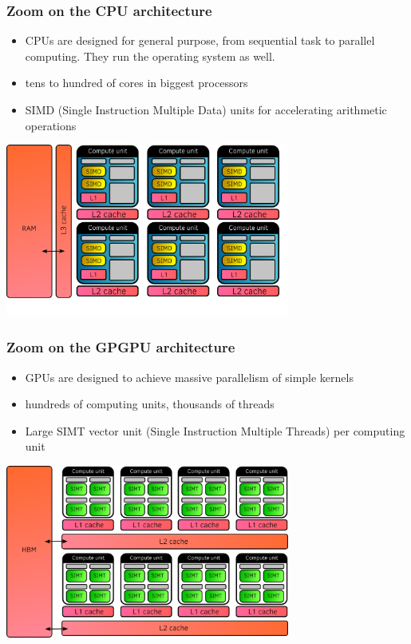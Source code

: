\documentclass[aspectratio=169]{beamer}
\begin{document}
\begin{frame}
    \frametitle{Zoom on the CPU architecture}

    \small
    \begin{itemize}
        \item CPUs are designed for general purpose, from sequential task to parallel computing. They run the operating system as well.
        \item tens to hundred of cores in biggest processors
        \item SIMD (Single Instruction Multiple Data) units for accelerating arithmetic operations
    \end{itemize}
    
    \begin{center}
        \includegraphics[width=0.7\textwidth]{../../images/cpu_architecture.png}
    \end{center}
    
\end{frame}



\begin{frame}
    \frametitle{Zoom on the GPGPU architecture}

\small
\begin{itemize}
    \item GPUs are designed to achieve massive parallelism of simple kernels
    \item hundreds of computing units, thousands of threads
    \item Large SIMT vector unit (Single Instruction Multiple Threads) per computing unit
\end{itemize}

\begin{center}
    \includegraphics[width=0.7\textwidth]{../../images/gpu_architecture.png}
\end{center}

\end{frame}
\end{document}
